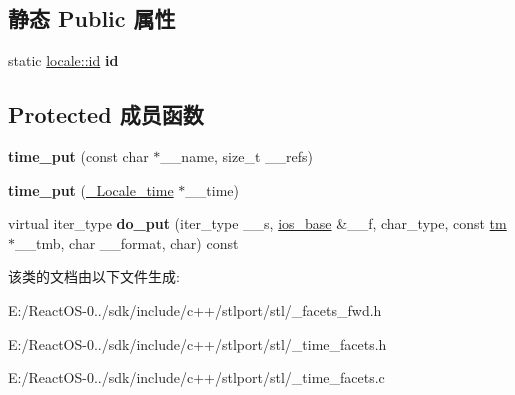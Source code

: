 \subsection*{静态 Public 属性}
\begin{DoxyCompactItemize}
\item 
\mbox{\label{classtime__put_aa2dbe89445f184b664e9e7aced81dfec}} 
static \hyperlink{classlocale_1_1id}{locale\+::id} {\bfseries id}
\end{DoxyCompactItemize}
\subsection*{Protected 成员函数}
\begin{DoxyCompactItemize}
\item 
\mbox{\label{classtime__put_a3a1d35bd736765b7126903348a0c9a62}} 
{\bfseries time\+\_\+put} (const char $\ast$\+\_\+\+\_\+name, size\+\_\+t \+\_\+\+\_\+refs)
\item 
\mbox{\label{classtime__put_ad66d09ca095079fc52c53842e558ad2d}} 
{\bfseries time\+\_\+put} (\hyperlink{struct___locale__time}{\+\_\+\+Locale\+\_\+time} $\ast$\+\_\+\+\_\+time)
\item 
\mbox{\label{classtime__put_a0b82071a55375b050b9ae7d7ed28bd41}} 
virtual iter\+\_\+type {\bfseries do\+\_\+put} (iter\+\_\+type \+\_\+\+\_\+s, \hyperlink{classios__base}{ios\+\_\+base} \&\+\_\+\+\_\+f, char\+\_\+type, const \hyperlink{structtm}{tm} $\ast$\+\_\+\+\_\+tmb, char \+\_\+\+\_\+format, char) const
\end{DoxyCompactItemize}


该类的文档由以下文件生成\+:\begin{DoxyCompactItemize}
\item 
E\+:/\+React\+O\+S-\/0../sdk/include/c++/stlport/stl/\+\_\+facets\+\_\+fwd.\+h\item 
E\+:/\+React\+O\+S-\/0../sdk/include/c++/stlport/stl/\+\_\+time\+\_\+facets.\+h\item 
E\+:/\+React\+O\+S-\/0../sdk/include/c++/stlport/stl/\+\_\+time\+\_\+facets.\+c\end{DoxyCompactItemize}
